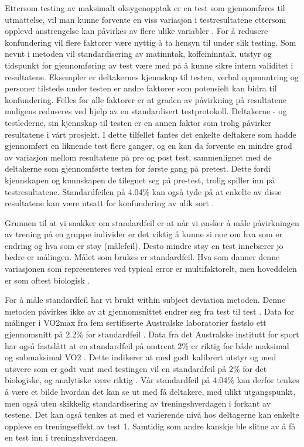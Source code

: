 \documentclass[
]{book}
\begin{document}
Ettersom testing av maksimalt oksygenopptak er en test som gjennomføres
til utmattelse, vil man kunne forvente en viss variasjon i
testresultatene ettersom opplevd anstrengelse kan påvirkes av flere
ulike variabler \citep{halperin2015}. For å redusere
konfundering
vil flere faktorer være nyttig å ta hensyn til under slik testing. Som
nevnt i metoden vil standardisering av matinntak, koffeininntak, utstyr
og tidspunkt for gjennomføring av test være med på å kunne sikre intern
validitet i resultatene. Eksempler er deltakernes kjennskap til testen,
verbal oppmuntring og personer tilstede under testen er andre faktorer
som potensielt kan bidra til konfundering. Felles for alle faktorer er
at graden av påvirkning på resultatene muligens reduseres ved hjelp av
en standardisert testprotokoll. Deltakerne - og testlederne, sin
kjennskap til testen er en annen faktor som trolig påvirker resultatene
i vårt prosjekt. I dette tilfellet fantes det enkelte deltakere som
hadde gjennomført en liknende test flere ganger, og en kan da forvente
en mindre grad av variasjon mellom resultatene på pre og post test,
sammenlignet med de deltakerne som gjennomførte testen for første gang
på pretest. Dette fordi kjennskapen og kunnskapen de tilegnet seg på
pre-test, trolig spiller inn på testresultatene.
Standardfeilen
på 4.04\% kan også tyde på at enkelte av disse resultatene kan være
utsatt for konfundering av ulik sort \citep{hopkins2000}.

Grunnen til at vi snakker om standardfeil er at når vi ønsker å måle
påvirkningen av trening på en gruppe individer er det viktig å kunne si
noe om hva som er endring og hva som er støy (målefeil). Desto mindre
støy en test innebærer jo bedre er målingen. Målet som brukes er
standardfeil. Hva som danner denne variasjonen som representeres ved
typical error er multifaktorelt, men hoveddelen er som oftest biologisk
\citep{hopkins2000}.

For å måle standardfeil har vi brukt within subject deviation metoden.
Denne metoden påvirkes ikke av at gjennomsnittet endrer seg fra test til
test \citep{hopkins2000} . Data for målinger i VO2max fra fem sertifiserte
Australske laboratorier fastslo ett gjennomsnitt på 2.2\% for
standardfeil \citep{halperin2015}. Data fra det Australske institutt for
sport har også fastslått at en standardfeil på omtrent 2\% er riktig for
både maksimal og submaksimal VO2 \citep{clark2007, robertson2010, saunders2009}. Dette indikerer at med godt kalibrert utstyr og med
utøvere som er godt vant med testingen vil en standardfeil på 2\% for det
biologiske, og analytiske være riktig \citep{halperin2015}. Vår standardfeil
på 4.04\% kan derfor tenkes å være et bilde hvordan det kan se ut med få
deltakere, med ulikt utgangspunkt, men også uten skikkelig
standardisering av treningshverdagen i forkant av testene. Det kan også
tenkes at med et varierende nivå hos deltagerne kan enkelte oppleve en
treningseffekt av test 1. Samtidig som andre kanskje ble slitne av å få
en test inn i treningshverdagen.
\end{document}
